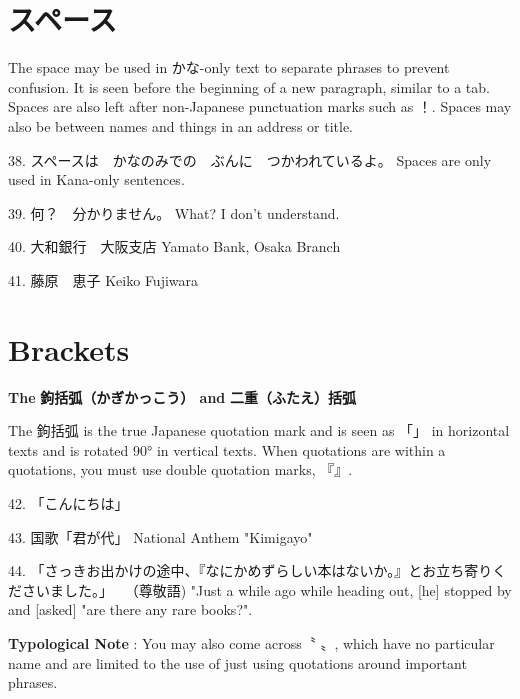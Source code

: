 \section{スペース}
 
\par{  The space may be used in かな-only text to separate phrases to prevent confusion. It is seen before the beginning of a new paragraph, similar to a tab. Spaces are also left after non-Japanese punctuation marks such as ！. Spaces may also be between names and things in an address or title. }

\par{38. スペースは　かなのみでの　ぶんに　つかわれているよ。 \hfill\break
Spaces are only used in Kana-only sentences. }

\par{39. 何？　分かりません。 \hfill\break
What? I don't understand. }

\par{40. 大和銀行　大阪支店 \hfill\break
Yamato Bank, Osaka Branch }

\par{41. 藤原　恵子 \hfill\break
Keiko Fujiwara }
      
\section{Brackets}
 
\begin{center}
\textbf{The }\textbf{鉤括弧（かぎかっこう） and }\textbf{二重（ふたえ）括弧 }
\end{center}

\par{The 鉤括弧 is the true Japanese quotation mark and is seen as 「」 in horizontal texts and is rotated 90° in vertical texts. When quotations are within a quotations, you must use double quotation marks, 『』. }

\par{42. 「こんにちは」 }

\par{43. 国歌「君が代」 \hfill\break
National Anthem "Kimigayo" }

\par{44. 「さっきお出かけの途中、『なにかめずらしい本はないか。』とお立ち寄りくださいました。」  （尊敬語) \hfill\break
"Just a while ago while heading out, [he] stopped by and [asked] "are there any rare books?". }

\par{\textbf{Typological Note }: You may also come across〝 〟, which have no particular name and are limited to the use of just using quotations around important phrases. }

